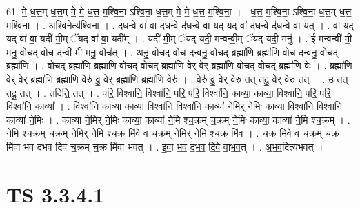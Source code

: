\documentclass[17pt]{extarticle}
\begin{document}
61. मे॒ ध॒त्त॒म् ध॒त्त॒म् मे॒ मे॒ ध॒त्त॒ म॒श्वि॒ना॒ ऽश्वि॒ना॒ ध॒त्त॒म् मे॒ मे॒ ध॒त्त॒ म॒श्वि॒ना॒ । . ध॒त्त॒ म॒श्वि॒ना॒ ऽश्वि॒ना॒ ध॒त्त॒म् ध॒त्त॒ म॒श्वि॒ना॒ । . अ॒श्वि॒नेत्य॑श्विना । . द॒ध॒न्वे वा॑ वा दध॒न्वे द॑ध॒न्वे वा॒ यद् यद् वा॑ दध॒न्वे द॑ध॒न्वे वा॒ यत् । . वा॒ यद् यद् वा॑ वा॒ यदी॑ मी॒म् ॅयद् वा॑ वा॒ यदी᳚म् । . यदी॑ मी॒म् ॅयद् यदी॒ मन्वन्वी॒म् ॅयद् यदी॒ मनु॑ । . ई॒ मन्वन्वी॑ मी॒ मनु॒ वोच॒द् वोच॒ दन्वी॑ मी॒ मनु॒ वोच॑त् । . अनु॒ वोच॒द् वोच॒ दन्वनु॒ वोच॒द् ब्रह्मा॑णि॒ ब्रह्मा॑णि॒ वोच॒ दन्वनु॒ वोच॒द् ब्रह्मा॑णि । . वोच॒द् ब्रह्मा॑णि॒ ब्रह्मा॑णि॒ वोच॒द् वोच॒द् ब्रह्मा॑णि॒ वेर् वेर् ब्रह्मा॑णि॒ वोच॒द् वोच॒द् ब्रह्मा॑णि॒ वेः । . ब्रह्मा॑णि॒ वेर् वेर् ब्रह्मा॑णि॒ ब्रह्मा॑णि॒ वेरु॑ वु॒ वेर् ब्रह्मा॑णि॒ ब्रह्मा॑णि॒ वेरु॑ । . वेरु॑ वु॒ वेर् वेरु॒ तत् तदु॒ वेर् वेरु॒ तत् । . उ॒ तत् तदू॒ तत् । . तदिति॒ तत् । . परि॒ विश्वा॑नि॒ विश्वा॑नि॒ परि॒ परि॒ विश्वा॑नि॒ काव्या॒ काव्या॒ विश्वा॑नि॒ परि॒ परि॒ विश्वा॑नि॒ काव्या᳚ । . विश्वा॑नि॒ काव्या॒ काव्या॒ विश्वा॑नि॒ विश्वा॑नि॒ काव्या॑ ने॒मिर् ने॒मिः काव्या॒ विश्वा॑नि॒ विश्वा॑नि॒ काव्या॑ ने॒मिः । . काव्या॑ ने॒मिर् ने॒मिः काव्या॒ काव्या॑ ने॒मि श्च॒क्रम् च॒क्रम् ने॒मिः काव्या॒ काव्या॑ ने॒मि श्च॒क्रम् । . ने॒मि श्च॒क्रम् च॒क्रम् ने॒मिर् ने॒मि श्च॒क्र मि॑वे व च॒क्रम् ने॒मिर् ने॒मि श्च॒क्र मि॑व । . च॒क्र मि॑वे व च॒क्रम् च॒क्र मि॑वा भव दभव दिव च॒क्रम् च॒क्र मि॑वा भवत् । . इ॒वा॒ भ॒व॒ द॒भ॒व॒ दि॒वे॒ वा॒भ॒व॒त् । . अ॒भ॒व॒दित्य॑भवत् । \newline
\pagebreak
{}

\section{ TS 3.3.4.1 }
\end{document}

